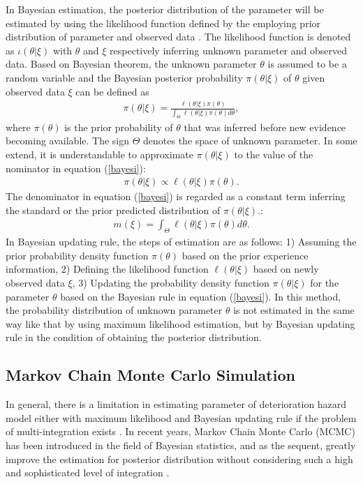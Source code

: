 In Bayesian estimation, the posterior distribution of the parameter will be estimated by using the likelihood function defined by the employing prior distribution of parameter and observed data \cite{andrwewgel}. The likelihood function is denoted as $\iota( \left. {\theta} \right|\xi)$ with  $\theta$ and $\xi$ respectively inferring unknown parameter and observed data. Based on Bayesian theorem, the unknown parameter $\theta$ is assumed to be a random variable and the Bayesian posterior probability $\pi (\left. {\theta} \right|\xi)$ of $\theta$ given observed data $\xi$ can be defined as
\begin{eqnarray}
\pi (\left. \theta  \right|\xi ) = \frac{{\ell (\left. \theta  \right|\xi )\pi (\theta )}}{{\int_\Theta  {\ell (\left. \theta  \right|\xi )\pi (\theta )d\theta } }}, \label{bayesi}
\end{eqnarray}
where $\pi (\theta )$ is the prior probability of $\theta$ that was inferred before new evidence becoming available. The sign $\Theta$ denotes the space of unknown parameter. In some extend, it is understandable to approximate $\pi (\left. {\theta} \right|\xi)$ to the value of the nominator in equation (\ref{bayesi}):
\begin{eqnarray}
\pi (\left. \theta  \right|\xi ) \propto \ell (\left. \theta  \right|\xi )\pi (\theta ). \label{pibayesian}
\end{eqnarray}
The denominator in equation (\ref{bayesi}) is regarded as a constant term inferring the standard or the prior predicted distribution of $\pi (\left. {\theta} \right|\xi)$.:
\begin{eqnarray}
m(\xi ) = \int_\Theta  {\ell (\left. \theta  \right|\xi )\pi (\theta )d\theta }. 
\end{eqnarray}
In Bayesian updating rule, the steps of estimation are as follows: 1) Assuming the prior probability density function $\pi(\theta)$ based on the prior experience information, 2) Defining the likelihood function $\ell (\left. \theta  \right|\xi )$ based on newly observed data $\xi$, 3) Updating the probability density function $\pi (\left. {\theta} \right|\xi)$ for the parameter $\theta$ based on the Bayesian rule in equation (\ref{bayesi}). In this method, the probability distribution of unknown parameter $\theta$ is not estimated in the same way like that by using maximum likelihood estimation, but by Bayesian updating rule in the condition of obtaining the posterior distribution.
\subsection{Markov Chain Monte Carlo Simulation}
\label{253}
In general, there is a limitation in estimating parameter of deterioration hazard model either with maximum likelihood and Bayesian updating rule if the problem of multi-integration exists \cite{wago,titter,robert}. In recent years, Markov Chain Monte Carlo (MCMC) has been introduced in the field of Bayesian statistics, and as the sequent, greatly improve the estimation for posterior distribution without considering such a high and sophisticated level of integration \cite{wago}. 

